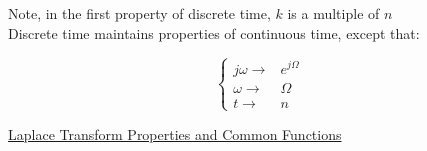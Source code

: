 \begin{center}
  Note, in the first property of discrete time, $k$ is a multiple of $n$\\
  Discrete time maintains properties of continuous time, except that:
\end{center}
\vspace{-15pt}

$$\boxed{\left\{\begin{array}{ll} j\omega\to& e^{j\Omega}\\\omega\to&\Omega\\ t\to&n \end{array}}$$

\begin{center}
  \underline{Laplace Transform Properties and Common Functions}
\end{center}
\vspace{-35pt}

